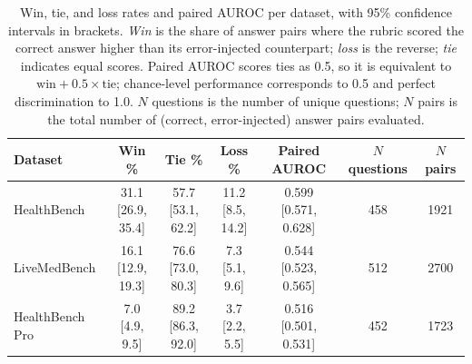 \documentclass{article}
\begin{document}
\begin{table}[H]
    \centering
    \small
    \renewcommand{\arraystretch}{1.3}
    \setlength{\tabcolsep}{4pt}
    \begin{tabular}{l c c c c c c}
        \toprule
        \textbf{Dataset} & \textbf{Win \%} & \textbf{Tie \%} & \textbf{Loss \%} & \textbf{Paired AUROC} & \textbf{$N$ questions} & \textbf{$N$ pairs} \\
        \midrule
        HealthBench &
            \makecell{31.1 \\ \small{[26.9, 35.4]}} &
            \makecell{57.7 \\ \small{[53.1, 62.2]}} &
            \makecell{11.2 \\ \small{[8.5, 14.2]}} &
            \makecell{0.599 \\ \small{[0.571, 0.628]}} &
            458 & 1921 \\
        LiveMedBench &
            \makecell{16.1 \\ \small{[12.9, 19.3]}} &
            \makecell{76.6 \\ \small{[73.0, 80.3]}} &
            \makecell{7.3 \\ \small{[5.1, 9.6]}} &
            \makecell{0.544 \\ \small{[0.523, 0.565]}} &
            512 & 2700 \\
        HealthBench Pro &
            \makecell{7.0 \\ \small{[4.9, 9.5]}} &
            \makecell{89.2 \\ \small{[86.3, 92.0]}} &
            \makecell{3.7 \\ \small{[2.2, 5.5]}} &
            \makecell{0.516 \\ \small{[0.501, 0.531]}} &
            452 & 1723 \\
        \bottomrule
    \end{tabular}
    \caption{Win, tie, and loss rates and paired AUROC per dataset, with 95\% confidence intervals in brackets. \textit{Win} is the share of answer pairs where the rubric scored the correct answer higher than its error-injected counterpart; \textit{loss} is the reverse; \textit{tie} indicates equal scores. Paired AUROC scores ties as 0.5, so it is equivalent to $\text{win} + 0.5 \times \text{tie}$; chance-level performance corresponds to 0.5 and perfect discrimination to 1.0. $N$ questions is the number of unique questions; $N$ pairs is the total number of (correct, error-injected) answer pairs evaluated.}
    \label{tab:win-tie-loss-auroc}
\end{table}
\end{document}
